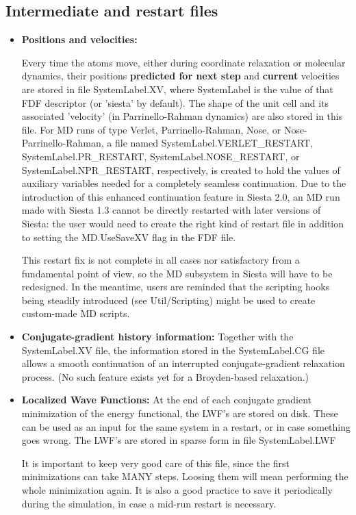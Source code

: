 \documentclass[11pt]{article}
\begin{document}
\subsection{Intermediate and restart files}

\begin{itemize}
\item {\bf Positions and velocities:}

Every time the atoms move, either during coordinate relaxation or
molecular dynamics, their positions {\bf predicted for next step} and
{\bf current} velocities are
stored in file SystemLabel.XV, where SystemLabel is the value of that
FDF descriptor (or 'siesta' by default).  The shape of the unit cell and
its associated 'velocity' (in Parrinello-Rahman dynamics) are also
stored in this file. For MD runs of type Verlet, Parrinello-Rahman,
Nose, or Nose-Parrinello-Rahman, a file named
SystemLabel.VERLET\_RESTART, SystemLabel.PR\_RESTART,
SystemLabel.NOSE\_RESTART, or SystemLabel.NPR\_RESTART, respectively, is
created to hold the values of auxiliary variables needed for a
completely seamless continuation. Due to the introduction of this
enhanced continuation feature in Siesta 2.0, an MD run made with
Siesta 1.3 cannot be directly restarted with later versions of Siesta: the user
would need to create the right kind of restart file in addition to
setting the MD.UseSaveXV flag in the FDF file. 

This restart fix is not complete in all cases nor satisfactory from a
fundamental point of view, so the MD subsystem in Siesta will have to
be redesigned. In the meantime, users are reminded that the scripting
hooks being steadily introduced (see Util/Scripting) might be used to
create custom-made MD scripts.


\item {\bf Conjugate-gradient history information:}
Together with the SystemLabel.XV file, the information
stored in the SystemLabel.CG file allows a smooth
continuation of an interrupted conjugate-gradient relaxation
process. (No such feature exists yet for a Broyden-based relaxation.)

\item {\bf Localized Wave Functions:} 
At the end of each conjugate gradient
minimization of the energy functional, the LWF's are
stored on disk. These can be used as an input for
the same system in a restart, or in case something goes
wrong.  The LWF's are stored in sparse form in
file SystemLabel.LWF

It is important to keep very good care of this file,
since the first minimizations can take MANY
steps. Loosing them will mean performing the 
whole minimization again. It is also a good practice 
to save it periodically during the
simulation, in case a mid-run restart is necessary.

\end{itemize}
\end{document}
